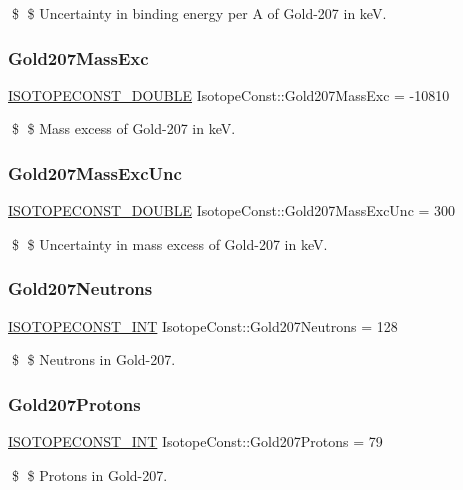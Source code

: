 \$ \$ Uncertainty in binding energy per A of Gold-\/207 in keV. \mbox{\label{group___isotope_const-_gold-_au207_ga613c265a2efb80184ae741882fe1d490}} 
\subsubsection{\texorpdfstring{Gold207\+Mass\+Exc}{Gold207MassExc}}
{\footnotesize\ttfamily \mbox{\hyperlink{group___isotope_const-_macros_ga8f45a7272ce02c0b4c65c44636ed719a}{I\+S\+O\+T\+O\+P\+E\+C\+O\+N\+S\+T\+\_\+\+D\+O\+U\+B\+LE}} Isotope\+Const\+::\+Gold207\+Mass\+Exc = -\/10810}

\$ \$ Mass excess of Gold-\/207 in keV. \mbox{\label{group___isotope_const-_gold-_au207_ga7bf8f3cfda83e6eb8fccfe9e6aa3a63f}} 
\subsubsection{\texorpdfstring{Gold207\+Mass\+Exc\+Unc}{Gold207MassExcUnc}}
{\footnotesize\ttfamily \mbox{\hyperlink{group___isotope_const-_macros_ga8f45a7272ce02c0b4c65c44636ed719a}{I\+S\+O\+T\+O\+P\+E\+C\+O\+N\+S\+T\+\_\+\+D\+O\+U\+B\+LE}} Isotope\+Const\+::\+Gold207\+Mass\+Exc\+Unc = 300}

\$ \$ Uncertainty in mass excess of Gold-\/207 in keV. \mbox{\label{group___isotope_const-_gold-_au207_gaf246c38352185b1ca314b5da893e6a57}} 
\subsubsection{\texorpdfstring{Gold207\+Neutrons}{Gold207Neutrons}}
{\footnotesize\ttfamily \mbox{\hyperlink{group___isotope_const-_macros_ga5f18360b3e99483a35c32d789e62621c}{I\+S\+O\+T\+O\+P\+E\+C\+O\+N\+S\+T\+\_\+\+I\+NT}} Isotope\+Const\+::\+Gold207\+Neutrons = 128}

\$ \$ Neutrons in Gold-\/207. \mbox{\label{group___isotope_const-_gold-_au207_gab27fdd511ed7987bd8bc5f9f974abc43}} 
\subsubsection{\texorpdfstring{Gold207\+Protons}{Gold207Protons}}
{\footnotesize\ttfamily \mbox{\hyperlink{group___isotope_const-_macros_ga5f18360b3e99483a35c32d789e62621c}{I\+S\+O\+T\+O\+P\+E\+C\+O\+N\+S\+T\+\_\+\+I\+NT}} Isotope\+Const\+::\+Gold207\+Protons = 79}

\$ \$ Protons in Gold-\/207. 